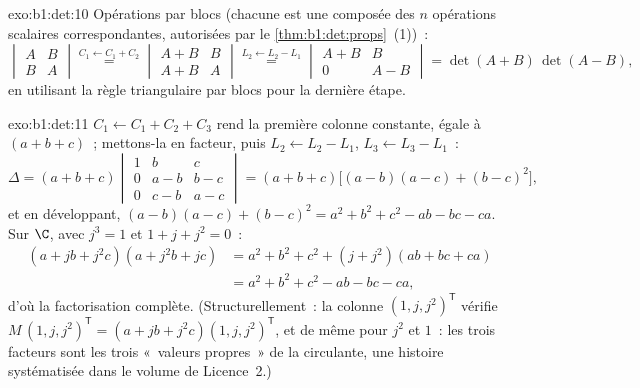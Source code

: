 \begin{solution}{exo:b1:det:10}
Opérations par blocs (chacune est une composée des $n$ opérations
scalaires correspondantes, autorisées par
le \cref{thm:b1:det:props}~(1))~:
\[
\begin{vmatrix} A & B\\ B & A\end{vmatrix}
\overset{C_1 \leftarrow C_1 + C_2}{=}
\begin{vmatrix} A + B & B\\ A + B & A\end{vmatrix}
\overset{L_2 \leftarrow L_2 - L_1}{=}
\begin{vmatrix} A + B & B\\ 0 & A - B\end{vmatrix}
= \det(A+B)\,\det(A-B),
\]
en utilisant la règle triangulaire par blocs pour la dernière étape.
\end{solution}

\begin{solution}{exo:b1:det:11}
$C_1 \leftarrow C_1 + C_2 + C_3$ rend la première colonne constante,
égale à $(a + b + c)$~; mettons-la en facteur, puis
$L_2 \leftarrow L_2 - L_1$, $L_3 \leftarrow L_3 - L_1$~:
\[
\Delta = (a+b+c)\begin{vmatrix}
1 & b & c\\
0 & a - b & b - c\\
0 & c - b & a - c
\end{vmatrix}
= (a+b+c)\bigl[(a-b)(a-c) + (b-c)^2\bigr],
\]
et en développant, $(a-b)(a-c) + (b-c)^2 = a^2 + b^2 + c^2 - ab - bc
- ca$. Sur $\C$, avec $j^3 = 1$ et $1 + j + j^2 = 0$~:
\begin{align*}
(a + jb + j^2c)(a + j^2b + jc)
&= a^2 + b^2 + c^2 + (j + j^2)(ab + bc + ca)\\
&= a^2 + b^2 + c^2 - ab - bc - ca ,
\end{align*}
d'où la factorisation complète. (Structurellement~: la colonne
$(1, j, j^2)^{\mathsf T}$ vérifie $M\,(1, j, j^2)^{\mathsf T}
= (a + jb + j^2c)(1, j, j^2)^{\mathsf T}$, et de même pour
$j^2$ et $1$~: les trois facteurs sont les trois «~valeurs propres~»
de la circulante, une histoire systématisée dans le volume de
Licence~2.)
\end{solution}

